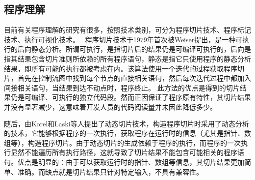  \subsection{程序理解}
 
 
 
 
 目前有关程序理解的研究有很多，按照技术类别，可分为程序切片技术、程序标记技术、执行可视化技术。 
 程序切片技术于1979年首次被Weiser\cite{weiser1979program}提出，是一种可执行的后向静态分析。所谓可执行，是指切片后的结果仍是可编译可执行的，后向是指其结果包含切片准则所依赖的所有程序语句，静态是指它只使用程序的静态分析结果，即所有可能的执行都被考虑在内。该算法使用一个迭代的过程获取程序切片，首先在控制流图中找到每个节点的直接相关语句，然后每次迭代过程中都加入间接相关语句，当结果到达不动点时，程序终止。
 此方法的优点是得到的切片结果仍是可编译、可执行的独立代码段。然而正因保证了程序原有特性，其切片结果并没有显著减少，这意味着开发人员的代码阅读量并未因此降低多少。
 
 随后，由Korel和Laski\cite{korel1988dynamic}等人提出了动态切片技术，构造程序切片时采用了动态分析的技术，它能够根据程序的一次执行，获取程序在运行时的信息（尤其是指针、数组等），构造程序切片。由于动态切片的生成依赖于程序的执行，而程序的一次执行显然不能遍历所有执行路径，这就导致了切片结果不能包含可能相关的程序语句。优点是明显的：由于可以获取运行时的指针、数组等信息，其切片结果更加简单、准确。而缺点就是切片结果只针对特定输入，不具有兼容性。
 
